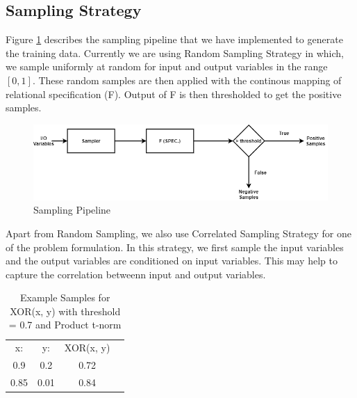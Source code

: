 
\subsection{Sampling Strategy}
Figure \ref{fig:sampling} describes the sampling pipeline that we have implemented to generate the training data.
Currently we are using Random Sampling Strategy in which, 
we sample uniformly at random for input and output variables in the range $[0, 1]$. 
These random samples are then applied with the continous mapping of relational specification (F). 
Output of F is then thresholded to get the positive samples. 

\begin{figure}
	\centering
    \includegraphics[scale=0.5]{sampling_bfs.png}
    \caption{Sampling Pipeline}
    \label{fig:sampling}
\end{figure}

Apart from Random Sampling, we also use Correlated Sampling Strategy for one of the problem formulation. 
In this strategy, we first sample the input variables and the output variables are conditioned on input variables. 
This may help to capture the correlation betweenn input and output variables.

\begin{table}[t]
\begin{center}
\begin{tabular}{cccc}
	x: & y: & XOR(x, y)\\ 
	0.9 & 0.2 & 0.72 \\  
	0.85 & 0.01 & 0.84
\end{tabular}
\caption{Example Samples for XOR(x, y) with threshold = 0.7 and Product t-norm}
\label{tab:tnorms}
\end{center}
\end{table}


